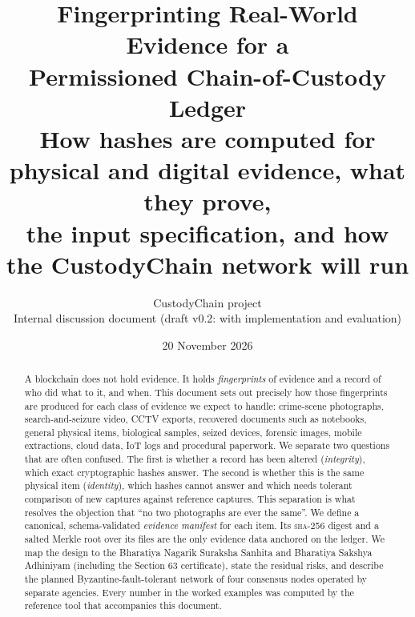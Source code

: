 \documentclass[11pt,a4paper]{article}
\title{\color{ink}\textbf{Fingerprinting Real-World Evidence for a\\Permissioned Chain-of-Custody Ledger}\\[0.4em]
\large How hashes are computed for physical and digital evidence, what they prove,\\ the input specification, and how the CustodyChain network will run}
\author{CustodyChain project\\\small Internal discussion document (draft v0.2: with implementation and evaluation)}
\date{20 November 2026}
\newcommand{\shatwo}{\textsc{sha-256}}
\begin{document}
\maketitle
\thispagestyle{empty}

\begin{abstract}
\noindent A blockchain does not hold evidence. It holds \emph{fingerprints} of evidence and a record of who did what to it, and when. This document sets out precisely how those fingerprints are produced for each class of evidence we expect to handle: crime-scene photographs, search-and-seizure video, CCTV exports, recovered documents such as notebooks, general physical items, biological samples, seized devices, forensic images, mobile extractions, cloud data, IoT logs and procedural paperwork. We separate two questions that are often confused. The first is whether a record has been altered (\emph{integrity}), which exact cryptographic hashes answer. The second is whether this is the same physical item (\emph{identity}), which hashes cannot answer and which needs tolerant comparison of new captures against reference captures. This separation is what resolves the objection that \enquote{no two photographs are ever the same}. We define a canonical, schema-validated \emph{evidence manifest} for each item. Its \shatwo{} digest and a salted Merkle root over its files are the only evidence data anchored on the ledger. We map the design to the Bharatiya Nagarik Suraksha Sanhita and Bharatiya Sakshya Adhiniyam (including the Section 63 certificate), state the residual risks, and describe the planned Byzantine-fault-tolerant network of four consensus nodes operated by separate agencies. Every number in the worked examples was computed by the reference tool that accompanies this document.
\end{abstract}

\tableofcontents
\newpage














\printbibliography[heading=bibintoc]

\appendix
\renewcommand{\thesection}{\Alph{section}}



\end{document}
